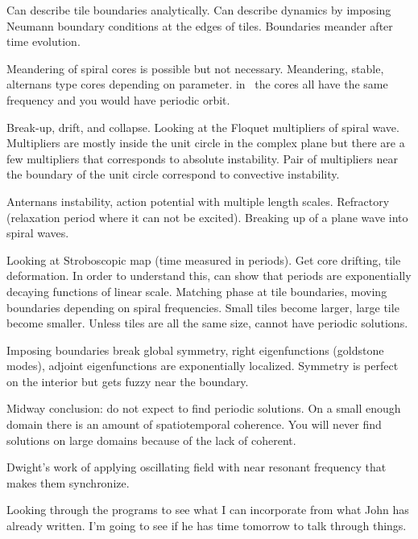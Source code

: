 \begin{description}
{\begin{description}
Can describe tile boundaries analytically. Can describe dynamics by imposing Neumann boundary conditions
at the edges of tiles. Boundaries meander after time evolution.

Meandering of spiral cores is possible but not necessary. Meandering, stable, alternans type cores depending on
parameter. in \CGLe\ the cores all have the same frequency and you would have periodic orbit.

Break-up, drift, and collapse.
Looking at the Floquet multipliers of spiral wave. Multipliers are mostly inside the unit circle in the
complex plane but there are a few multipliers that corresponds to absolute instability. Pair of multipliers
near the boundary of the unit circle correspond to convective instability.

Anternans instability, action potential with multiple length scales. Refractory (relaxation period where it
can not be excited). Breaking up of a plane wave into spiral waves.

Looking at Stroboscopic map (time measured in periods). Get core drifting, tile deformation. In order
to understand this, can show that periods are exponentially decaying functions of linear scale. Matching
phase at tile boundaries, moving boundaries depending on spiral frequencies. Small tiles become larger,
large tile become smaller. Unless tiles are all the same size, cannot have periodic solutions.

Imposing boundaries break global symmetry, right eigenfunctions (goldstone modes), adjoint eigenfunctions
are exponentially localized. Symmetry is perfect on the interior but gets fuzzy near the boundary.

Midway conclusion: do not expect to find periodic solutions. On a small enough domain there is an amount
of spatiotemporal coherence. You will never find solutions on large domains because of the lack of coherent.

Dwight's work of applying oscillating field with near resonant frequency that makes them synchronize.


\item[Channelflow]
Looking through the programs to see what I can incorporate from what John has already written. I'm going to
see if he has time tomorrow to talk through things.
\end{description}
}

\end{description}
